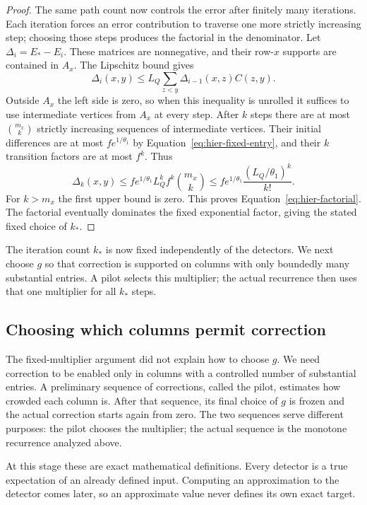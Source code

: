 \begin{proof}
The same path count now controls the error after finitely many iterations. Each iteration forces an error contribution to traverse one more strictly increasing step; choosing those steps produces the factorial in the denominator. Let $\Delta_i=E_*-E_i$. These matrices are nonnegative, and their
row-$x$ supports are contained in $A_x$.  The Lipschitz bound gives
\[
 \Delta_i(x,y)\leq
 L_Q\sum_{z<y}\Delta_{i-1}(x,z)C(z,y).
\]
Outside $A_x$ the left side is zero, so when this inequality is unrolled
it suffices to use intermediate vertices from $A_x$ at every step.
After $k$ steps there are at most $\binom{m_x}{k}$ strictly increasing
sequences of intermediate vertices.  Their initial differences are at
most $fe^{1/\theta_1}$ by Equation~\eqref{eq:hier-fixed-entry}, and
their $k$ transition factors are at most $f^k$.  Thus
\[
 \Delta_k(x,y)
 \leq fe^{1/\theta_1}L_Q^kf^k\binom{m_x}{k}
 \leq fe^{1/\theta_1}\frac{(L_Q/\theta_1)^k}{k!}.
\]
For $k>m_x$ the first upper bound is zero.  This proves
Equation~\eqref{eq:hier-factorial}.  The factorial eventually dominates
the fixed exponential factor, giving the stated fixed choice of $k_*$.
\end{proof}

The iteration count $k_*$ is now fixed independently of the detectors.
We next choose $g$ so that correction is supported on columns with only
boundedly many substantial entries.  A pilot selects this multiplier;
the actual recurrence then uses that one multiplier for all $k_*$ steps.

\subsection{Choosing which columns permit correction}

The fixed-multiplier argument did not explain how to choose $g$. We need correction to be enabled only in columns with a controlled number of substantial entries. A preliminary sequence of corrections, called the pilot, estimates how crowded each column is. After that sequence, its final choice of $g$ is frozen and the actual correction starts again from zero. The two sequences serve different purposes: the pilot chooses the multiplier; the actual sequence is the monotone recurrence analyzed above.

At this stage these are exact mathematical definitions. Every detector is a true expectation of an already defined input. Computing an approximation to the detector comes later, so an approximate value never defines its own exact target.

